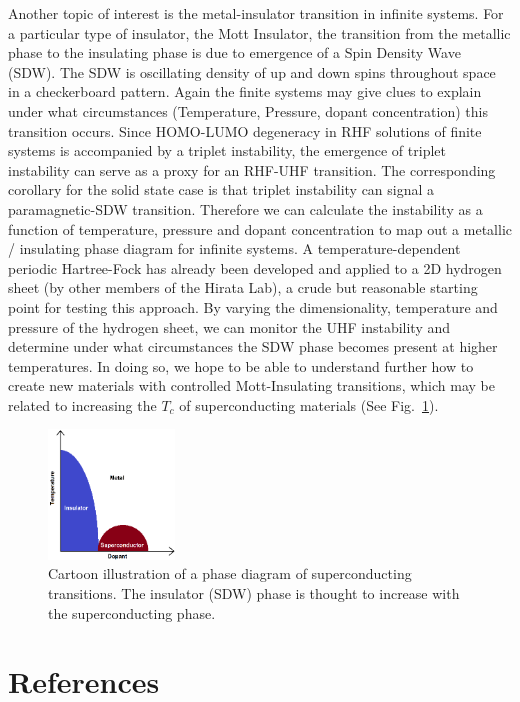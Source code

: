 \documentclass{revtex4}
\begin{document}
    Another topic of interest is the metal-insulator transition in infinite systems. For a particular type of insulator, the Mott Insulator, the transition from the metallic phase to the insulating phase is due to emergence of a Spin Density Wave (SDW). The SDW is oscillating density of up and down spins throughout space in a checkerboard pattern. Again the finite systems may give clues to explain under what circumstances (Temperature, Pressure, dopant concentration) this transition occurs. Since HOMO-LUMO degeneracy in RHF solutions of finite systems is accompanied by a triplet instability, the emergence of triplet instability can serve as a proxy for an RHF-UHF transition. The corresponding corollary for the solid state case is that triplet instability can signal a paramagnetic-SDW transition. Therefore we can calculate the instability as a function of temperature, pressure and dopant concentration to map out a metallic / insulating phase diagram for infinite systems. A temperature-dependent periodic Hartree-Fock has already been developed and applied to a 2D hydrogen sheet (by other members of the Hirata Lab), a crude but reasonable starting point for testing this approach. By varying the dimensionality, temperature and pressure of the hydrogen sheet, we can monitor the UHF instability and determine under what circumstances the SDW phase becomes present at higher temperatures. In doing so, we hope to be able to understand further how to create new materials with controlled Mott-Insulating transitions, which may be related to increasing the $T_c$ of superconducting materials (See Fig.~\ref{scphase}). 
    
    \begin{figure}
       	\centering
       	\includegraphics[width=0.3\textwidth]{../figures/NSFdiagram.png}
       	\caption{Cartoon illustration of a phase diagram of superconducting transitions. The insulator (SDW) phase is thought to increase with the superconducting phase.}
       	\label{scphase}
    \end{figure}
    
       
      
\newpage
\section{References}

\end{document}
